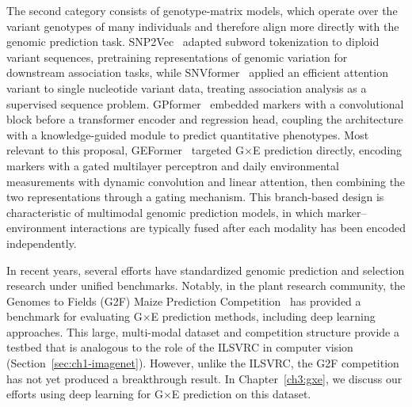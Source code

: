 The second category consists of genotype-matrix models, which operate over the variant genotypes of many individuals and therefore align more directly with the genomic prediction task. SNP2Vec~\cite{snp2vec} adapted subword tokenization to diploid variant sequences, pretraining representations of genomic variation for downstream association tasks, while SNVformer~\cite{snvformer} applied an efficient attention variant to single nucleotide variant data, treating association analysis as a supervised sequence problem. GPformer~\cite{wu2023transformer} embedded markers with a convolutional block before a transformer encoder and regression head, coupling the architecture with a knowledge-guided module to predict quantitative phenotypes. Most relevant to this proposal, GEFormer~\cite{geformer} targeted G$\times$E prediction directly, encoding markers with a gated multilayer perceptron and daily environmental measurements with dynamic convolution and linear attention, then combining the two representations through a gating mechanism. This branch-based design is characteristic of multimodal genomic prediction models, in which marker--environment interactions are typically fused after each modality has been encoded independently.

In recent years, several efforts have standardized genomic prediction and selection research under unified benchmarks. Notably, in the plant research community, the Genomes to Fields (G2F) Maize Prediction Competition~\cite{g2f-2024-competition} has provided a benchmark for evaluating G$\times$E prediction methods, including deep learning approaches. This large, multi-modal dataset and competition structure provide a testbed that is analogous to the role of the ILSVRC in computer vision (Section~\ref{sec:ch1-imagenet}). However, unlike the ILSVRC, the G2F competition has not yet produced a breakthrough result. In Chapter~\ref{ch3:gxe}, we discuss our efforts using deep learning for G$\times$E prediction on this dataset.

